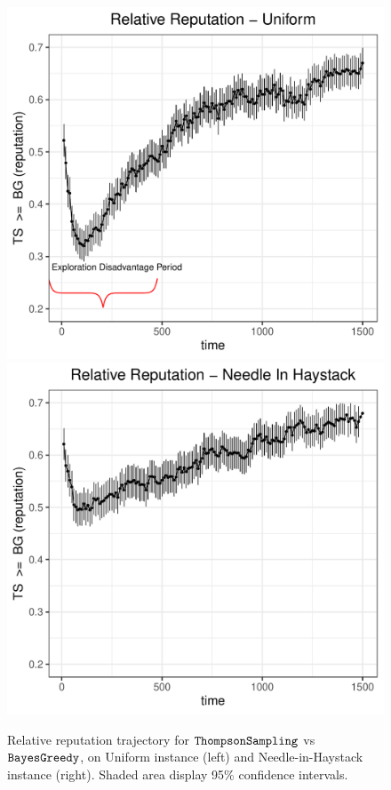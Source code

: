 \documentclass[../competing_bandits.tex]{subfiles}
\begin{document}
\begin{figure}[ht]
\centering
\includegraphics[scale=0.35]{ec19paper/figures/relative_uniform_annotated_plot}
\includegraphics[scale=0.35]{ec19paper/figures/relative_nih_ts_dg}
\caption{Relative reputation trajectory for $\mathtt{ThompsonSampling}$ vs $\mathtt{BayesGreedy}$, on Uniform instance (left) and Needle-in-Haystack instance (right). Shaded area display 95\% confidence intervals.}
\label{relative_rep_plots}
\end{figure}
\end{document}
